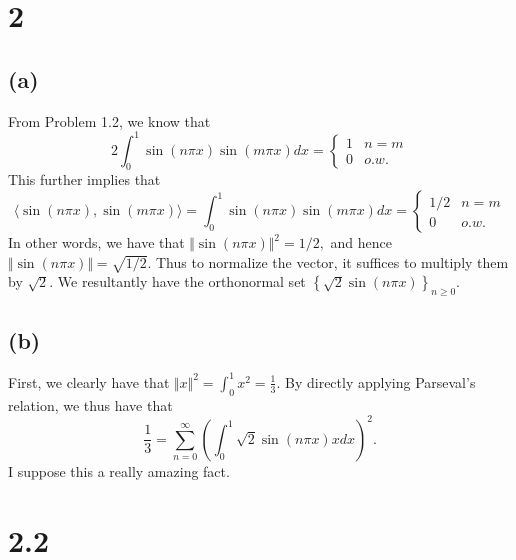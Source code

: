 \documentclass[10pt]{article}
\begin{document}
\section*{2}

\subsection*{(a)}

From Problem 1.2, we know that
\begin{equation*}
    2\int_{0}^{1}\sin(n\pi x)\sin(m\pi x)dx = \begin{cases*}
        1 & n=m\\
        0 & o.w.
    \end{cases*}
\end{equation*}
This further implies that
\begin{equation*}
    \langle \sin(n\pi x), \sin(m\pi x)\rangle = \int_{0}^{1}\sin(n\pi x)\sin(m\pi x)dx = \begin{cases*}
        1/2 & n=m\\
        0 & o.w.
    \end{cases*}
\end{equation*}
In other words, we have that $\Vert \sin(n\pi x)\Vert^2 = 1/2,$ and hence $\Vert \sin(n\pi x)\Vert = \sqrt{1/2}.$ Thus to normalize the vector, it suffices to multiply them by $\sqrt{2}.$
We resultantly have the orthonormal set $\left \{\sqrt{2}\sin(n\pi x)\right \}_{n\ge 0}.$

\subsection*{(b)}

First, we clearly have that $\Vert x\Vert^2 = \int_0^1 x^2 = \frac{1}{3}.$
By directly applying Parseval's relation, we thus have that
\[\frac{1}{3} = \sum_{n=0}^{\infty} \left (\int_{0}^{1}\sqrt{2}\sin(n\pi x)xdx\right)^2.\]
I suppose this a really amazing fact.

\section*{2.2}
\end{document}
